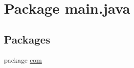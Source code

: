 \hypertarget{namespacemain_1_1java}{\section{Package main.\-java}
\label{namespacemain_1_1java}
}
\subsection*{Packages}
\begin{DoxyCompactItemize}
\item 
package \hyperlink{namespacemain_1_1java_1_1com}{com}
\end{DoxyCompactItemize}
